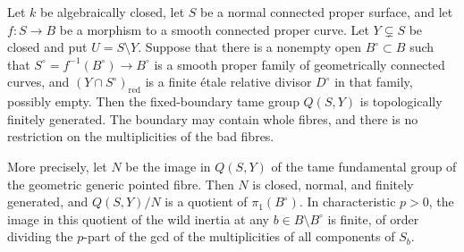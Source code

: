 \begin{proposition}
\label{D:log-fibration-criterion}
Let $k$ be algebraically closed, let $S$ be a normal connected
proper surface, and let $f:S\to B$ be a morphism to a smooth
connected proper curve.  Let $Y\subsetneq S$ be closed and put
$U=S\setminus Y$.  Suppose that there is a nonempty open
$B^\circ\subset B$ such that $S^\circ=f^{-1}(B^\circ)\to B^\circ$
is a smooth proper family of geometrically connected curves,
and $(Y\cap S^\circ)_{\mathrm{red}}$ is a finite \'etale relative
divisor $D^\circ$ in that family, possibly empty.  Then the
fixed-boundary tame group $Q(S,Y)$ is topologically finitely
generated.  The boundary may contain whole fibres, and there
is no restriction on the multiplicities of the bad fibres.

More precisely, let $N$ be the image in $Q(S,Y)$ of the tame
fundamental group of the geometric generic pointed fibre.
Then $N$ is closed, normal, and finitely generated, and
$Q(S,Y)/N$ is a quotient of $\pi_1(B^\circ)$.  In characteristic
$p>0$, the image in this quotient of the wild inertia at any
$b\in B\setminus B^\circ$ is finite, of order dividing the
$p$-part of the gcd of the multiplicities of all components
of $S_b$.
\end{proposition}
